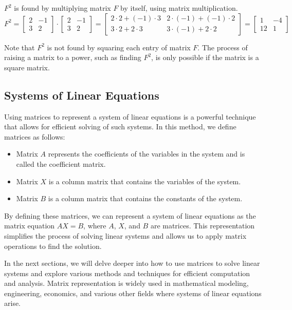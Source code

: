 \begin{solution}
    $F^2$ is found by multiplying matrix $F$ by itself, using matrix multiplication.
    \[
        F^2 = \begin{bmatrix} 2 & -1 \\ 3 & 2 \end{bmatrix} \cdot \begin{bmatrix} 2 & -1 \\ 3 & 2 \end{bmatrix} = \begin{bmatrix} 2\cdot2 + (-1)\cdot3 & 2\cdot(-1) + (-1)\cdot2 \\ 3\cdot2 + 2\cdot3 & 3\cdot(-1) + 2\cdot2 \end{bmatrix} = \begin{bmatrix} 1 & -4 \\ 12 & 1 \end{bmatrix}
    \]

    Note that $F^2$ is not found by squaring each entry of matrix $F$. The process of raising a matrix to a power, such as finding $F^2$, is only possible if the matrix is a square matrix.
\end{solution}

\subsection{Systems of Linear Equations}

Using matrices to represent a system of linear equations is a powerful technique that allows for efficient solving of such systems. In this method, we define matrices as follows:

\begin{itemize}
    \item Matrix $A$ represents the coefficients of the variables in the system and is called the coefficient matrix.
    \item Matrix $X$ is a column matrix that contains the variables of the system.
    \item Matrix $B$ is a column matrix that contains the constants of the system.
\end{itemize}

By defining these matrices, we can represent a system of linear equations as the matrix equation $AX = B$, where $A$, $X$, and $B$ are matrices. This representation simplifies the process of solving linear systems and allows us to apply matrix operations to find the solution.

In the next sections, we will delve deeper into how to use matrices to solve linear systems and explore various methods and techniques for efficient computation and analysis. Matrix representation is widely used in mathematical modeling, engineering, economics, and various other fields where systems of linear equations arise.

